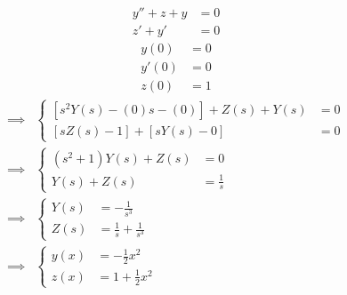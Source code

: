 \documentclass[11pt,a4paper,titlepage,final]{article}
\begin{document}
\begin{exercise*}{12.15}
	\begin{align*}
	y''+z+y &= 0 \\ 
	z'+y' &= 0
	\end{align*}
	\begin{align*}
	y(0) &= 0 \\ y'(0) &= 0 \\ z(0)&=1
	\end{align*}
	\tcblower
	\begin{align*}
	\implies& \begin{cases}
	\left[s^2Y(s)-(0)s-(0)\right] + Z(s) + Y(s) &= 0 \\
	\left[sZ(s)-1\right]+\left[sY(s)-0\right] &= 0
	\end{cases}
	\\ \implies & \begin{cases}
	(s^2+1)Y(s)+Z(s) &= 0\\
	Y(s) + Z(s) &= \frac{1}{s}
	\end{cases}
	\\ \implies & \begin{cases}
	Y(s) &= -\frac{1}{s^3} \\
	Z(s) &= \frac{1}{s} + \frac{1}{s^3}
	\end{cases} \\ \implies & \begin{cases}
	y(x) &= -\frac{1}{2}x^2 \\
	z(x) &= 1 + \frac{1}{2}x^2
	\end{cases}
	\end{align*}
\end{exercise*}
\end{document}
